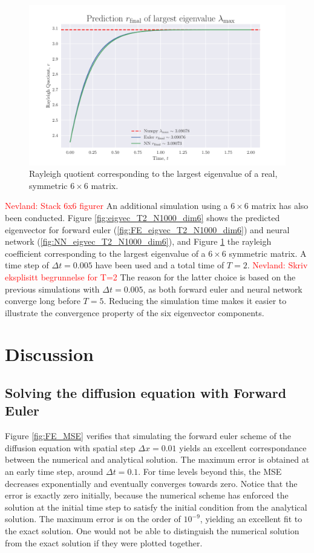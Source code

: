 \documentclass[12pt]{extarticle}
\begin{document}
\begin{figure}[h]
	\centering
	\includegraphics[scale=0.6]{../output/plots/eigval_T2_N1000_dim6.pdf}
	\caption{Rayleigh quotient corresponding to the largest eigenvalue of a real, symmetric $6\times 6$ matrix.}
	\label{fig:eigval_T2_N1000_dim6}
\end{figure}

\textcolor{red}{Nevland: Stack 6x6 figurer} An additional simulation using a $6\times 6$ matrix has also been conducted. Figure \ref{fig:eigvec_T2_N1000_dim6} shows the predicted eigenvector for forward euler (\ref{fig:FE_eigvec_T2_N1000_dim6}) and neural network (\ref{fig:NN_eigvec_T2_N1000_dim6}), and Figure \ref{fig:eigval_T2_N1000_dim6} the rayleigh coefficient corresponding to the largest eigenvalue of a $6\times 6$ symmetric matrix. A time step of $\Delta t = 0.005$ have been used and a total time of $T=2$. \textcolor{red}{Nevland: Skriv eksplisitt begrunnelse for T=2} The reason for the latter choice is based on the previous simulations with $\Delta t=0.005$, as both forward euler and neural network converge long before $T=5$. Reducing the simulation time makes it easier to illustrate the convergence property of the six eigenvector components.
 
 
\clearpage
\section{Discussion}

\subsection{Solving the diffusion equation with Forward Euler}
Figure \ref{fig:FE_MSE} verifies that simulating the forward euler scheme of the diffusion equation with spatial step $\Delta x = 0.01$ yields an excellent correspondance between the numerical and analytical solution. The maximum error is obtained at an early time step, around $\Delta t = 0.1$. For time levels beyond this, the MSE decreases exponentially and eventually converges towards zero. Notice that the error is exactly zero initially, because the numerical scheme has enforced the solution at the initial time step to satisfy the initial condition from the analytical solution. The maximum error is on the order of $10^{-9}$, yielding an excellent fit to the exact solution. One would not be able to distinguish the numerical solution from the exact solution if they were plotted together.
\end{document}
